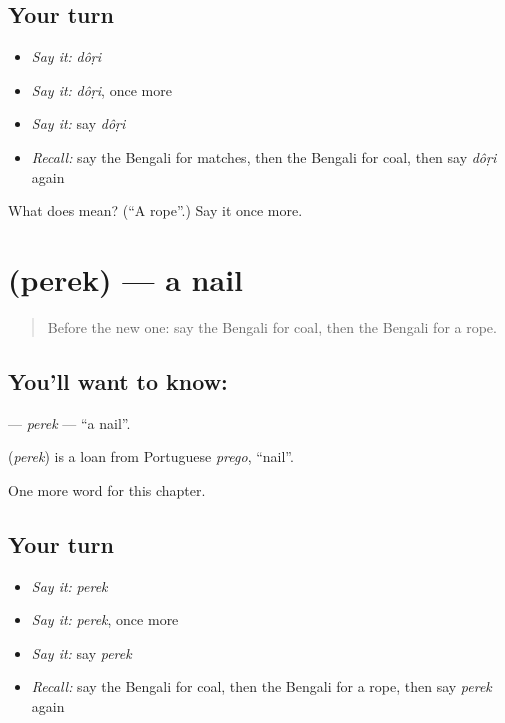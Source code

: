 \subsection*{Your turn}
\begin{itemize}
\raggedright
  \item \emph{Say it:} \emph{dôṛi}
  \item \emph{Say it:} \emph{dôṛi}, once more
  \item \emph{Say it:} say \emph{dôṛi}
  \item \emph{Recall:} say the Bengali for matches, then the Bengali for coal, then say \emph{dôṛi} again
\end{itemize}

\begin{tcolorbox}[breakable,colback=teal!4,colframe=teal!35!black,title={Before you move on}]
What does  mean? (\textquotedblleft{}A rope\textquotedblright{}.) Say it once more.
\end{tcolorbox}
\section[\texorpdfstring{\bn{পেরেক} (perek)}{পেরেক (perek)}]{ (perek) — a nail}

\label{lesson:BN-C111-perek}



\begin{quote}
Before the new one: say the Bengali for coal, then the Bengali for a rope.
\end{quote}

\subsection*{You'll want to know: }
\textbf{} — \emph{perek} — \textquotedblleft{}a nail\textquotedblright{}.

\begin{cousinweb}
\textbf{} (\emph{perek}) is a loan from Portuguese \emph{prego}, \textquotedblleft{}nail\textquotedblright{}.
\end{cousinweb}

\begin{grammarlens}[title={What you've built}]
One more word for this chapter.
\end{grammarlens}

\subsection*{Your turn}
\begin{itemize}
\raggedright
  \item \emph{Say it:} \emph{perek}
  \item \emph{Say it:} \emph{perek}, once more
  \item \emph{Say it:} say \emph{perek}
  \item \emph{Recall:} say the Bengali for coal, then the Bengali for a rope, then say \emph{perek} again
\end{itemize}

